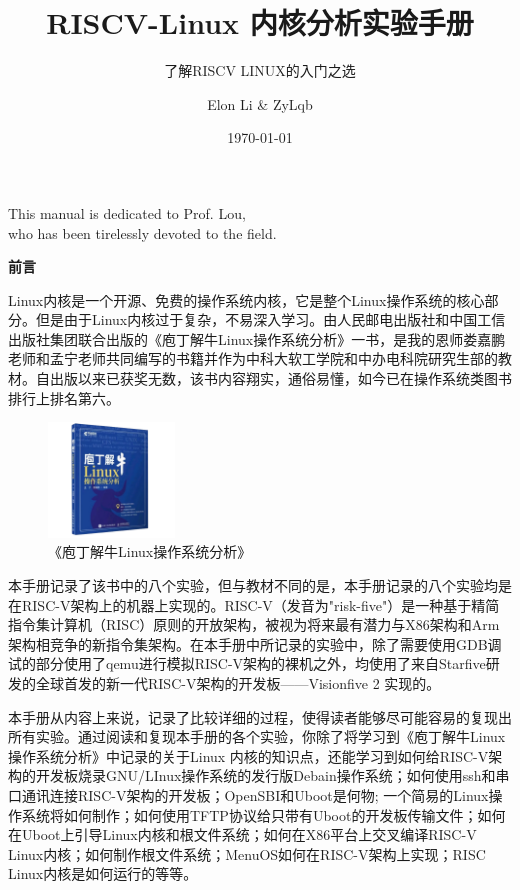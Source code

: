 \documentclass[lang=cn,10pt]{elegantbook}
\title{RISCV-Linux 内核分析实验手册}
\subtitle{了解RISCV LINUX的入门之选}
\author{Elon Li \& ZyLqb}
\institute{Beijing Electronic Science and Technology Institute}
\date{\today}
\begin{document}
\maketitle
\frontmatter

\newpage

\vspace*{\fill}
\begin{center}
{\Large\calligra This manual is dedicated to Prof. Lou, \\who has been tirelessly devoted to the field.}
\end{center}
\vspace*{\fill}

\newpage
\thispagestyle{empty} 
\begin{center}
  \textbf{\large 前言}
\end{center}

Linux内核是一个开源、免费的操作系统内核，它是整个Linux操作系统的核心部分。但是由于Linux内核过于复杂，不易深入学习。由人民邮电出版社和中国工信出版社集团联合出版的《庖丁解牛Linux操作系统分析》一书，是我的恩师娄嘉鹏老师和孟宁老师共同编写的书籍并作为中科大软工学院和中办电科院研究生部的教材。自出版以来已获奖无数，该书内容翔实，通俗易懂，如今已在操作系统类图书排行上排名第六。

\begin{figure}[htbp]
  \centering
  \includegraphics[width=0.3\textwidth]{image/linuxbook.jpg}
  \caption{《庖丁解牛Linux操作系统分析》}
\end{figure}

本手册记录了该书中的八个实验，但与教材不同的是，本手册记录的八个实验均是在RISC-V架构上的机器上实现的。RISC-V（发音为"risk-five"）是一种基于精简指令集计算机（RISC）原则的开放架构，被视为将来最有潜力与X86架构和Arm架构相竞争的新指令集架构。在本手册中所记录的实验中，除了需要使用GDB调试的部分使用了qemu进行模拟RISC-V架构的裸机之外，均使用了来自Starfive研发的全球首发的新一代RISC-V架构的开发板——Visionfive 2 实现的。

本手册从内容上来说，记录了比较详细的过程，使得读者能够尽可能容易的复现出所有实验。通过阅读和复现本手册的各个实验，你除了将学习到《庖丁解牛Linux操作系统分析》中记录的关于Linux 内核的知识点，还能学习到如何给RISC-V架构的开发板烧录GNU/LInux操作系统的发行版Debain操作系统；如何使用ssh和串口通讯连接RISC-V架构的开发板；OpenSBI和Uboot是何物; 一个简易的Linux操作系统将如何制作；如何使用TFTP协议给只带有Uboot的开发板传输文件；如何在Uboot上引导Linux内核和根文件系统；如何在X86平台上交叉编译RISC-V Linux内核；如何制作根文件系统；MenuOS如何在RISC-V架构上实现；RISC Linux内核是如何运行的等等。
\end{document}
